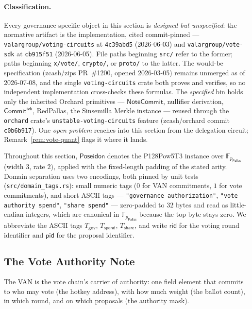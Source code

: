 \documentclass[11pt,a4paper]{article}
\theoremstyle{definition}
\newcommand{\F}{\mathbb{F}}
\newcommand{\Pallas}{\ensuremath{\mathsf{Pallas}}}
\newcommand{\NoteCommit}{\ensuremath{\mathsf{NoteCommit}}}
\newcommand{\CommitIvk}{\ensuremath{\mathsf{Commit}^{\mathsf{ivk}}}}
\begin{document}
\paragraph{Classification.} Every governance-specific object in this section
is \emph{designed but unspecified}: the normative artifact is the
implementation, cited commit-pinned ---
\texttt{valargroup/voting-circuits} at \texttt{4c39abd5} (2026-06-03) and
\texttt{valargroup/vote-sdk} at \texttt{cb915f51} (2026-06-05). File paths
beginning \texttt{src/} refer to the former; paths beginning
\texttt{x/vote/}, \texttt{crypto/}, or \texttt{proto/} to the latter. The
would-be specification (zcash/zips PR~\#1200, opened 2026-03-05) remains
unmerged as of 2026-07-08, and the single \texttt{voting-circuits} crate both
proves and verifies, so no independent implementation cross-checks these
formulas. The \emph{specified} bin holds only the inherited Orchard
primitives --- \NoteCommit, nullifier derivation, \CommitIvk, RedPallas, the
Sinsemilla Merkle instance --- reused through the \texttt{orchard} crate's
\texttt{unstable-voting-circuits} feature (zcash/orchard commit
\texttt{c0b6b917}). One \emph{open problem} reaches into this section from
the delegation circuit; Remark~\ref{rem:vote-quant} flags it where it lands.

Throughout this section, $\mathsf{Poseidon}$ denotes the P128Pow5T3 instance
over $\F_{p_{\Pallas}}$ (width $3$, rate $2$), applied with the fixed-length
padding of the stated arity. Domain separation uses two encodings, both
pinned by unit tests (\texttt{src/domain\_tags.rs}): small numeric tags ($0$
for VAN commitments, $1$ for vote commitments), and short ASCII tags ---
\texttt{"governance authorization"}, \texttt{"vote authority spend"},
\texttt{"share spend"} --- zero-padded to $32$ bytes and read as little-endian
integers, which are canonical in $\F_{p_{\Pallas}}$ because the top byte
stays zero. We abbreviate the ASCII tags $T_{\mathsf{gov}}$,
$T_{\mathsf{spend}}$, $T_{\mathsf{share}}$, and write $\mathsf{rid}$ for the
voting round identifier and $\mathsf{pid}$ for the proposal identifier.

\subsection{The Vote Authority Note}\label{sec:vote-van}

The VAN is the vote chain's carrier of authority: one field element that
commits to who may vote (the hotkey address), with how much weight (the
ballot count), in which round, and on which proposals (the authority mask).
\end{document}
